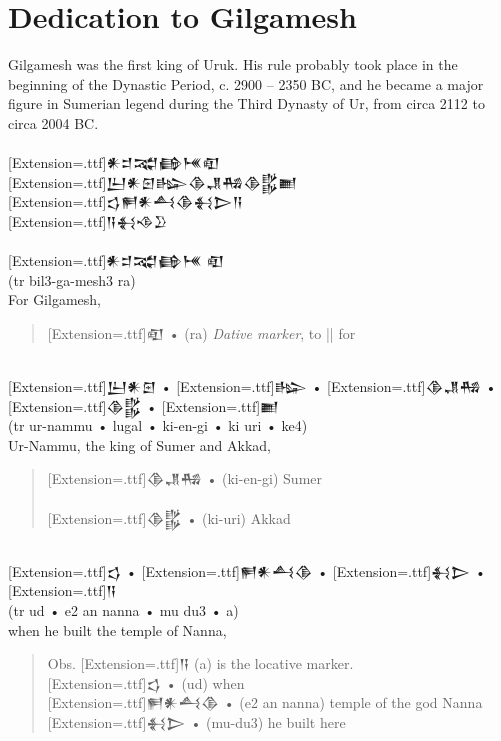 \documentclass[a4paper,12pt]{book}
\newcommand{\fcn}{\setmainfont{Akkadian}[Extension=.ttf]}
\newcommand{\fcm}{\large\setmainfont{Akkadian}[Extension=.ttf]}
\newcommand{\fsm}{\Large\setmainfont{Akkadian}[Extension=.ttf]}
\begin{document}
\section*{Dedication to Gilgamesh}
Gilgamesh was the first king of Uruk. His rule
probably took place in the beginning of the
Dynastic Period, c. 2900 – 2350 BC, and he became
a major figure in Sumerian legend during the
Third Dynasty of Ur, from circa 2112 to circa 2004 BC.\\

\verb||\\
{\fsm 𒀭𒄑𒉋𒂵𒎌𒊏}\\
{\fsm 𒌨𒀭𒇉𒈗𒆠𒂗𒄀𒆠𒌵𒆤}\\
{\fsm 𒌓𒂍𒀭𒋀𒆠𒈬𒆕𒀀}\\
{\fsm 𒀀𒈬𒈾𒊒}\\

\verb||\\
{\large\fcn 𒀭𒄑𒉋𒂵𒎌 𒊏}\\
(tr bil3-ga-mesh3 ra)\\
For Gilgamesh,
\begin{quote}
{\fcm 𒊏} • (ra) {\em Dative marker}, to || for\\
\end{quote}

\verb||\\
{\fcm 𒌨𒀭𒇉} • {\fcm 𒈗} • {\fcm 𒆠𒂗𒄀}
     • {\fcm 𒆠𒌵} • {\fcm 𒆤}\\
(tr ur-nammu  • lugal  • ki-en-gi • ki uri • ke4)\\
Ur-Nammu, the king of Sumer and Akkad,\\
\begin{quote}
{\fcm 𒆠𒂗𒄀} • (ki-en-gi) Sumer\\
\verb||\\  
{\fcm 𒆠𒌵} • (ki-uri) Akkad
\end{quote}

\verb||\\
{\fcm 𒌓} • {\fcm 𒂍𒀭𒋀𒆠} • {\fcm 𒈬𒆕} • {\fcm 𒀀}\\
(tr ud • e2 an nanna • mu du3 • a)\\
when he built the temple of Nanna,\\
\begin{quote}
Obs. {\fcn 𒀀} (a) is the locative marker.\\
{\fcm 𒌓} • (ud) when\\
{\fcm 𒂍𒀭𒋀𒆠} • (e2 an nanna) temple of the god Nanna\\
{\fcm 𒈬𒆕} • (mu-du3) he built here
\end{quote}
\end{document}
